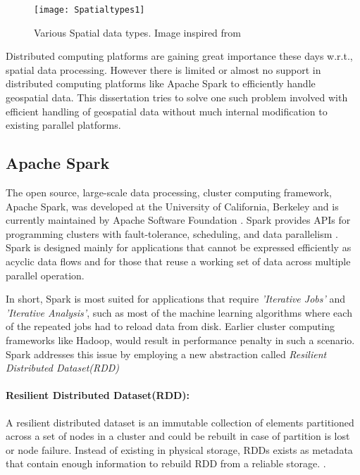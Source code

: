 \documentclass[article,type=msc,colorback,12pt,accentcolor=tud1d]{tudthesis}
\begin{document}
			   \begin{figure}[h]
				   	\centering
				   	\texttt{[image: Spatialtypes1]}
				   	\caption{Various Spatial data types. Image inspired from \cite{spatialdatatypes}  }
				   	\label{fig:spatialdatatypes}
			   \end{figure}
			  
			   Distributed computing platforms are gaining great importance these days w.r.t., spatial data processing. However there is limited or almost no support in distributed computing platforms like Apache Spark to efficiently handle geospatial data. This dissertation tries to solve one such problem involved with efficient handling of geospatial data without much internal modification to existing parallel platforms.
			   
			   \clearpage
		   \subsection{Apache Spark}
		   
		   \par The open source, large-scale data processing, cluster computing framework, Apache Spark\cite{sparkmainpaper}, was developed at the University of California, Berkeley and is currently maintained by Apache Software Foundation \cite{sparkHomePage} . Spark provides APIs for programming clusters with fault-tolerance, scheduling, and data parallelism \cite{wiki:spark}. Spark is designed mainly for applications that cannot be expressed efficiently as acyclic data flows and for those that reuse a working set of data across multiple parallel operation. 
		   
		   In short, Spark is most suited for applications that require \textit{'Iterative Jobs'} and \textit{'Iterative Analysis'}, such as most of the machine learning algorithms where each of the repeated jobs had to reload data from disk. Earlier cluster computing frameworks like Hadoop, would result in performance penalty in such a scenario. Spark addresses this issue by employing a new abstraction called \textit{Resilient Distributed Dataset(RDD)} \cite{sparkmainpaper}
		   
		   \paragraph{Resilient Distributed Dataset(RDD):}
		   
		   A resilient distributed dataset is an immutable collection of elements partitioned across a set of nodes in a cluster and could be rebuilt in case of partition is lost or node failure. Instead of existing in physical storage, RDDs exists as metadata that contain enough information to rebuild RDD from a reliable storage. \cite{sparkmainpaper}. 
		   
\end{document}
